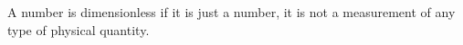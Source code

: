 A number is dimensionless if it is just a number, it
is not a measurement of any type of physical quantity.